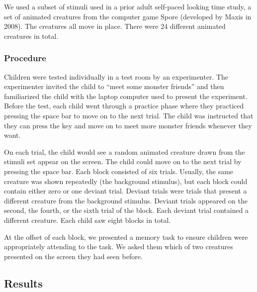 \documentclass[10pt, letterpaper]{article}
\begin{document}
We used a subset of stimuli used in a prior adult self-paced looking
time study, a set of animated creatures from the computer game Spore
(developed by Maxis in 2008). The creatures all move in place. There
were 24 different animated creatures in total.

\hypertarget{procedure}{%
\subsubsection{Procedure}\label{procedure}}

Children were tested individually in a test room by an experimenter. The
experimenter invited the child to ``meet some monster friends'' and then
familiarized the child with the laptop computer used to present the
experiment. Before the test, each child went through a practice phase
where they practiced pressing the space bar to move on to the next
trial. The child was instructed that they can press the key and move on
to meet more monster friends whenever they want.

On each trial, the child would see a random animated creature drawn from
the stimuli set appear on the screen. The child could move on to the
next trial by pressing the space bar. Each block consisted of six
trials. Usually, the same creature was shown repeatedly (the background
stimulus), but each block could contain either zero or one deviant
trial. Deviant trials were trials that present a different creature from
the background stimulus. Deviant trials appeared on the second, the
fourth, or the sixth trial of the block. Each deviant trial contained a
different creature. Each child saw eight blocks in total.

At the offset of each block, we presented a memory task to ensure
children were appropriately attending to the task. We asked them which
of two creatures presented on the screen they had seen before.

\hypertarget{results}{%
\subsection{Results}\label{results}}
\end{document}
